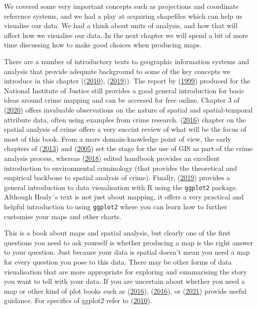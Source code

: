 \documentclass[
  krantz2]{krantz}
\begin{document}
We covered some very important concepts such as projections and coordinate reference systems, and we had a play at acquiring shapefiles which can help us visualise our data. We had a think about units of analysis, and how that will affect how we visualise our data. In the next chapter we will spend a bit of more time discussing how to make good choices when producing maps.

There are a number of introductory texts to geographic information systems and analysis that provide adequate background to some of the key concepts we introduce in this chapter ((\protect\hyperlink{ref-OSullivan_2010}{2010}), (\protect\hyperlink{ref-Bolstad_2019}{2019})). The report by (\protect\hyperlink{ref-Harries_1999}{1999}) produced for the National Institute of Justice still provides a good general introduction for basic ideas around crime mapping and can be accessed for free online. Chapter 3 of (\protect\hyperlink{ref-Haining_2020}{2020}) offers invaluable observations on the nature of spatial and spatial-temporal attribute data, often using examples from crime research. (\protect\hyperlink{ref-Radil_2016}{2016}) chapter on the spatial analysis of crime offers a very succint review of what will be the focus of most of this book. From a more domain-knowledge point of view, the early chapters of (\protect\hyperlink{ref-Boba_2013}{2013}) and (\protect\hyperlink{ref-Chainey_2005}{2005}) set the stage for the use of GIS as part of the crime analysis process, whereas (\protect\hyperlink{ref-Bruinsma_2018}{2018}) edited handbook provides an excellent introduction to environmental criminology (that provides the theoretical and empirical backbone to spatial analysis of crime). Finally, (\protect\hyperlink{ref-Healy_2019}{2019}) provides a general introduction to data visualisation with R using the \texttt{ggplot2} package. Although Healy´s text is not just about mapping, it offers a very practical and helpful introduction to using \texttt{ggplot2} where you can learn how to further customise your maps and other charts.

This is a book about maps and spatial analysis, but clearly one of the first questions you need to ask yourself is whether producing a map is the right answer to your question. Just because your data is spatial doesn't mean you need a map for every question you pose to this data. There may be other forms of data visualisation that are more appropriate for exploring and summarising the story you want to tell with your data. If you are uncertain about whether you need a map or other kind of plot books such as (\protect\hyperlink{ref-Cairo_2016}{2016}), (\protect\hyperlink{ref-Camoes_2016}{2016}), or (\protect\hyperlink{ref-Schwabish_2021}{2021}) provide useful guidance. For specifics of ggplot2 refer to (\protect\hyperlink{ref-Wickham_2010}{2010}).
\end{document}
